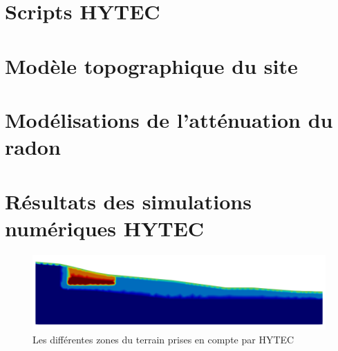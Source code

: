 \documentclass{article}
\begin{document}
\renewcommand\lstlistingname{Script n°}
\renewcommand\lstlistlistingname{}

\newpage
\section{Scripts HYTEC}
\label{lst:modele_hydro_chimie_final}

\newpage

\newpage



\newpage
\section{Modèle topographique du site}

\label{lst:modele_topo}

\newpage
\section{Modélisations de l'atténuation du radon}
\label{lst:modele_radon_1_1}


\newpage
\label{lst:modele_radon_1_2}



\newpage
\label{lst:modele_radon_2}



\newpage
\section{Résultats des simulations numériques HYTEC}
\label{annexe:modele-transport-reactive}

\begin{figure}[H]
    \centering
    \includegraphics[width=\linewidth]{LJ-zones-HYTEC-final.png}
    \caption{Les différentes zones du terrain prises en compte par HYTEC}
    \label{fig:zones_HYTEC}
\end{figure}
\end{document}
